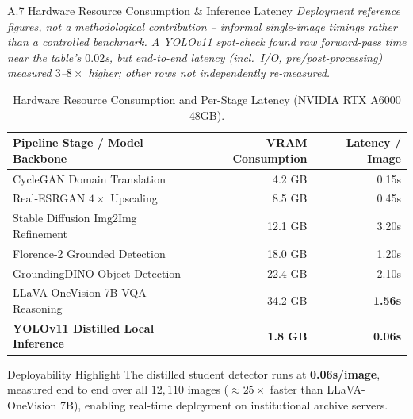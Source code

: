 \documentclass[aspectratio=169,11pt]{beamer}
\begin{document}
\begin{frame}{A.7 Hardware Resource Consumption \& Inference Latency}
\tiny
\centering
\textit{Deployment reference figures, not a methodological contribution -- informal single-image timings rather than a controlled benchmark. A YOLOv11 spot-check found raw forward-pass time near the table's $0.02$s, but end-to-end latency (incl.\ I/O, pre/post-processing) measured $3$--$8\times$ higher; other rows not independently re-measured.}
\vskip 0.2cm
\begin{table}[!htbp]
\caption{Hardware Resource Consumption and Per-Stage Latency (NVIDIA RTX A6000 48GB).}
\begin{tabular}{lrr}
\toprule
\textbf{Pipeline Stage / Model Backbone} & \textbf{VRAM Consumption} & \textbf{Latency / Image} \\
\midrule
CycleGAN Domain Translation & 4.2 GB & 0.15s \\
Real-ESRGAN $4\times$ Upscaling & 8.5 GB & 0.45s \\
Stable Diffusion Img2Img Refinement & 12.1 GB & 3.20s \\
Florence-2 Grounded Detection & 18.0 GB & 1.20s \\
GroundingDINO Object Detection & 22.4 GB & 2.10s \\
LLaVA-OneVision 7B VQA Reasoning & 34.2 GB & \textbf{1.56s} \\
\textbf{YOLOv11 Distilled Local Inference} & \textbf{1.8 GB} & \textbf{0.06s} \\
\bottomrule
\end{tabular}
\end{table}

\begin{block}{Deployability Highlight}
The distilled student detector runs at \textbf{0.06s/image}, measured end to end over all $12{,}110$ images ($\approx25\times$ faster than LLaVA-OneVision 7B), enabling real-time deployment on institutional archive servers.
\end{block}
\end{frame}
\end{document}
